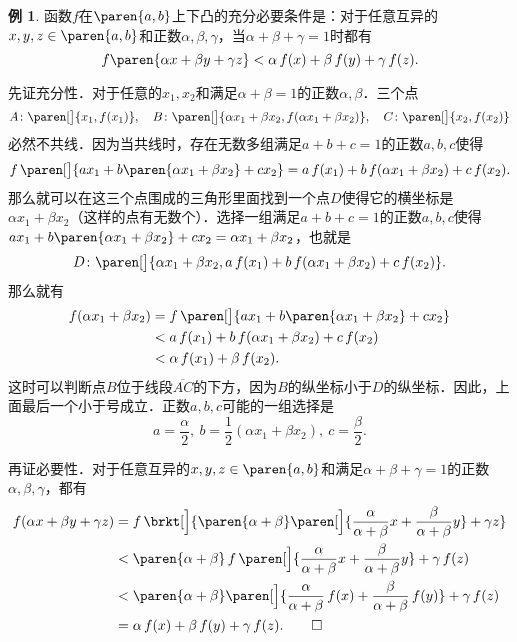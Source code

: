 \documentclass[a4paper,punct=CCT]{ctexbook}
\makeatletter
\theoremstyle{definition}
\newtheorem*{example*}{例}
\theoremstyle{remark}
\renewenvironment{proof}[1][\proofname]{\par
  \pushQED{\qed}%
  \normalfont \topsep6\p@\@plus6\p@\relax
  \trivlist
  \item[]\ignorespaces
}{%
  \popQED\endtrivlist\@endpefalse
}
\makeatother
\begin{document}
\begin{example*}
  函数\(f\)在\(\paren{a,b}\)上下凸的充分必要条件是：对于任意互异的\(x, y, z \in \paren{a,b}\)和正数\(\alpha, \beta, \gamma\)，当\(\alpha+\beta+\gamma=1\)时都有
  \[
    f\paren{\alpha x + \beta y + \gamma z} < \alpha\,f(x) + \beta\,f(y) + \gamma\,f(z).
  \]

  \begin{proof}
    先证充分性．对于任意的\(x_1, x_2\)和满足\(\alpha+\beta=1\)的正数\(\alpha, \beta\)．三个点
    \[
      A\colon \paren[\big]{x_1, f(x_1)},\quad B\colon \paren[\big]{\alpha x_1 + \beta x_2, f(\alpha x_1 + \beta x_2)},\quad C\colon \paren[\big]{x_2, f(x_2)}
    \]
    必然不共线．因为当共线时，存在无数多组满足\(a+b+c=1\)的正数\(a, b, c\)使得
    \[
      f\,\paren[\big]{a x_1 + b\paren{\alpha x_1 + \beta x_2}  + c x_2} = a\,f(x_1) + b\,f(\alpha x_1 + \beta x_2) + c\,f(x_2).
    \]
    那么就可以在这三个点围成的三角形里面找到一个点\(D\)使得它的横坐标是\(\alpha x_1 + \beta x_2\)（这样的点有无数个）．选择一组满足\(a+b+c=1\)的正数\(a, b, c\)使得\(a x_1 + b\paren{\alpha x_1 + \beta x_2}  + c x_2 = \alpha x_1 + \beta x_2 \)，也就是
    \[
      D\colon \paren[\big]{\alpha x_1 + \beta x_2, a\,f(x_1) + b\,f(\alpha x_1 + \beta x_2) + c\,f(x_2)}.
    \]
    那么就有
    \[
      \begin{split}
        f(\alpha x_1 + \beta x_2)
        &= f\,\paren[\big]{a x_1 + b\paren{\alpha x_1 + \beta x_2}  + c x_2} \\
        &< a\,f(x_1) + b\,f(\alpha x_1 + \beta x_2) + c\,f(x_2) \\
        &< \alpha\,f(x_1) + \beta\,f(x_2).
      \end{split}
    \]
    这时可以判断点\(B\)位于线段\(\overline{AC}\)的下方，因为\(B\)的纵坐标小于\(D\)的纵坐标．因此，上面最后一个小于号成立．正数\(a, b, c\)可能的一组选择是
    \[
      a = \frac\alpha2,\ b = \frac12(\alpha x_1 + \beta x_2),\ c = \frac\beta2.
    \]

    再证必要性．对于任意互异的\(x, y, z \in \paren{a,b}\)和满足\(\alpha+\beta+\gamma=1\)的正数\(\alpha, \beta, \gamma\)，都有
    \[
      \begin{split}
        f(\alpha x + \beta y + \gamma z)
        &= f\,\brkt[\Big]{\paren{\alpha+\beta}\paren[\Big]{\frac{\alpha}{\alpha+\beta} x + \frac{\beta}{\alpha+\beta} y} + \gamma z} \\
        &< \paren{\alpha+\beta}\,f\,\paren[\Big]{\frac{\alpha}{\alpha+\beta} x + \frac{\beta}{\alpha+\beta} y} + \gamma\,f(z) \\
        &< \paren{\alpha+\beta}\paren[\Big]{\frac{\alpha}{\alpha+\beta}\,f(x) + \frac{\beta}{\alpha+\beta}\,f(y)} + \gamma\,f(z) \\
        &= \alpha\,f(x) + \beta\,f(y) + \gamma\,f(z). \qedhere
      \end{split}
    \]


\end{proof}
\end{example*}
\end{document}
